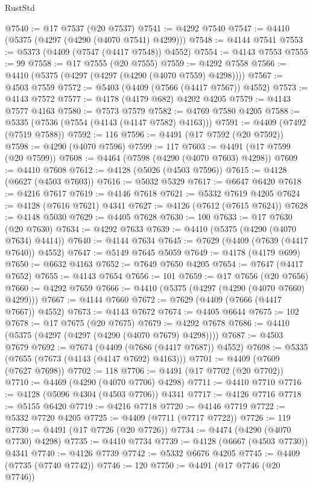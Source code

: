 \begin{lexlean}{RustStd}
\begin{coremodule}
@7540 := @17 @7537 (@20 @7537)
@7541 := @4292 @7540
@7547 := @4410 (@5375 (@4297 (@4290 (@4070 @7541) @4299)))
@7548 := @4144 @7541
@7553 := @5373 (@4409 (@7547 (@4417 @7548)) @4552)
@7554 := @4143 @7553
@7555 := 99
@7558 := @17 @7555 (@20 @7555)
@7559 := @4292 @7558
@7566 := @4410 (@5375 (@4297 (@4297 (@4290 (@4070 @7559) @4298))))
@7567 := @4503 @7559
@7572 := @5403 (@4409 (@7566 (@4417 @7567)) @4552)
@7573 := @4143 @7572
@7577 := @4178 (@4179 @682) @4202 @4205
@7579 := @4143 @7577 @4163
@7580 := @7573 @7579
@7582 := @4769 @7580 @4205
@7588 := @5335 (@7536 (@7554 (@4143 (@4147 @7582) @4163)))
@7591 := @4409 (@7492 (@7519 @7588))
@7592 := 116
@7596 := @4491 (@17 @7592 (@20 @7592))
@7598 := @4290 (@4070 @7596)
@7599 := 117
@7603 := @4491 (@17 @7599 (@20 @7599))
@7608 := @4464 (@7598 (@4290 (@4070 @7603) @4298))
@7609 := @4410 @7608
@7612 := @4128 (@5026 (@4503 @7596))
@7615 := @4128 (@6627 (@4503 @7603))
@7616 := @5032 @5329
@7617 := @6647 @6420
@7618 := @4216 @7617
@7619 := @4146 @7618
@7621 := @5332 @7619 @4205
@7624 := @4128 (@7616 @7621) @4341
@7627 := @4126 (@7612 (@7615 @7624))
@7628 := @4148 @5030
@7629 := @4405 @7628
@7630 := 100
@7633 := @17 @7630 (@20 @7630)
@7634 := @4292 @7633
@7639 := @4410 (@5375 (@4290 (@4070 @7634) @4414))
@7640 := @4144 @7634
@7645 := @7629 (@4409 (@7639 (@4417 @7640)) @4552)
@7647 := @5149 @7645 @5059
@7649 := @4178 (@4179 @699)
@7650 := @6632 @4163
@7652 := @7649 @7650 @4205
@7654 := @7647 (@4417 @7652)
@7655 := @4143 @7654
@7656 := 101
@7659 := @17 @7656 (@20 @7656)
@7660 := @4292 @7659
@7666 := @4410 (@5375 (@4297 (@4290 (@4070 @7660) @4299)))
@7667 := @4144 @7660
@7672 := @7629 (@4409 (@7666 (@4417 @7667)) @4552)
@7673 := @4143 @7672
@7674 := @4405 @6644
@7675 := 102
@7678 := @17 @7675 (@20 @7675)
@7679 := @4292 @7678
@7686 := @4410 (@5375 (@4297 (@4297 (@4290 (@4070 @7679) @4298))))
@7687 := @4503 @7679
@7692 := @7674 (@4409 (@7686 (@4417 @7687)) @4552)
@7698 := @5335 (@7655 (@7673 (@4143 (@4147 @7692) @4163)))
@7701 := @4409 (@7609 (@7627 @7698))
@7702 := 118
@7706 := @4491 (@17 @7702 (@20 @7702))
@7710 := @4469 (@4290 (@4070 @7706) @4298)
@7711 := @4410 @7710
@7716 := @4128 (@5096 @4304 (@4503 @7706)) @4341
@7717 := @4126 @7716
@7718 := @5155 @6420
@7719 := @4216 @7718
@7720 := @4146 @7719
@7722 := @5332 @7720 @4205
@7725 := @4409 (@7711 (@7717 @7722))
@7726 := 119
@7730 := @4491 (@17 @7726 (@20 @7726))
@7734 := @4474 (@4290 (@4070 @7730) @4298)
@7735 := @4410 @7734
@7739 := @4128 (@6667 (@4503 @7730)) @4341
@7740 := @4126 @7739
@7742 := @5332 @6676 @4205
@7745 := @4409 (@7735 (@7740 @7742))
@7746 := 120
@7750 := @4491 (@17 @7746 (@20 @7746))

\end{coremodule}
\end{lexlean}
